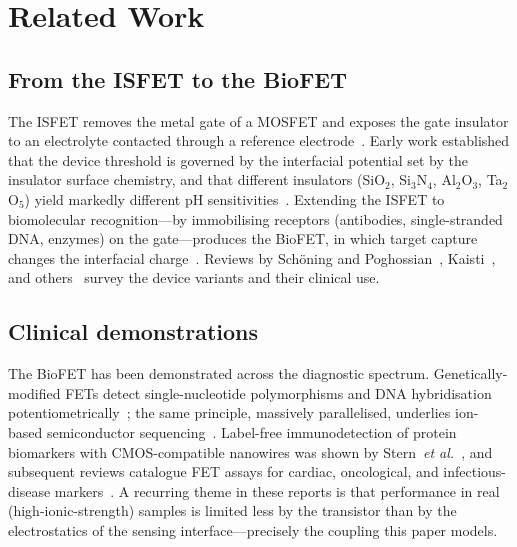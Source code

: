\documentclass[10pt,journal]{IEEEtran}
\begin{document}
\section{Related Work}
\label{sec:related}

\subsection{From the ISFET to the BioFET}
The ISFET removes the metal gate of a MOSFET and exposes the gate insulator to an
electrolyte contacted through a reference electrode~\cite{bergveld1970}. Early
work established that the device threshold is governed by the interfacial
potential set by the insulator surface chemistry, and that different
insulators (SiO$_2$, Si$_3$N$_4$, Al$_2$O$_3$, Ta$_2$O$_5$) yield markedly
different pH sensitivities~\cite{bousse1983,bergveld2003}. Extending the ISFET to
biomolecular recognition---by immobilising receptors (antibodies, single-stranded
DNA, enzymes) on the gate---produces the BioFET, in which target capture changes
the interfacial charge~\cite{schoning2002,poghossian2014,sakata2005}. Reviews by
Sch\"oning and Poghossian~\cite{schoning2002}, Kaisti~\cite{kaisti2017}, and
others~\cite{lee2009,syu2018,vu2020} survey the device variants and their
clinical use.

\subsection{Clinical demonstrations}
The BioFET has been demonstrated across the diagnostic spectrum. Genetically-modified
FETs detect single-nucleotide polymorphisms and DNA hybridisation
potentiometrically~\cite{sakata2005}; the same principle, massively parallelised,
underlies ion-based semiconductor sequencing~\cite{rothberg2011}. Label-free
immunodetection of protein biomarkers with CMOS-compatible nanowires was shown by
Stern~\emph{et al.}~\cite{stern2007}, and subsequent reviews catalogue
FET assays for cardiac, oncological, and infectious-disease
markers~\cite{kimura2018,syu2018,vu2020}. A recurring theme in these reports is
that performance in real (high-ionic-strength) samples is limited less by the
transistor than by the electrostatics of the sensing interface---precisely the
coupling this paper models.
\end{document}
